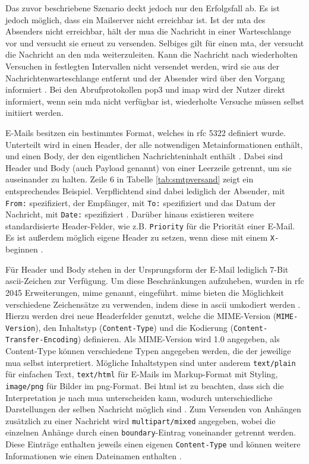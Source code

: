 Das zuvor beschriebene Szenario deckt jedoch nur den Erfolgsfall ab. Es ist jedoch möglich, dass ein Mailserver nicht erreichbar ist. Ist der \acrshort{mta} des Absenders nicht erreichbar, hält der \acrshort{mua} die Nachricht in einer Warteschlange vor und versucht sie erneut zu versenden. Selbiges gilt für einen \acrshort{mta}, der versucht die Nachricht an den \acrshort{mda} weiterzuleiten. Kann die Nachricht nach wiederholten Versuchen in festlegten Intervallen nicht versendet werden, wird sie aus der Nachrichtenwarteschlange entfernt und der Absender wird über den Vorgang informiert \citep[S. 144 f.]{Kurose2014}. Bei den Abrufprotokollen \acrshort{pop3} und \acrshort{imap} wird der Nutzer direkt informiert, wenn sein \acrshort{mda} nicht verfügbar ist, wiederholte Versuche müssen selbst initiiert werden.

E-Mails besitzen ein bestimmtes Format, welches in \acrshort{rfc} 5322 definiert wurde. Unterteilt wird in einen Header, der alle notwendigen Metainformationen enthält, und einen Body, der den eigentlichen Nachrichteninhalt enthält \citep[S. 6 ff.]{RFC5322}. Dabei sind Header und Body (auch Payload genannt) von einer Leerzeile getrennt, um sie auseinander zu halten. Zeile 6 in Tabelle \ref{tab:smtpversand} zeigt ein entsprechendes Beispiel. Verpflichtend sind dabei lediglich der Absender, mit \texttt{From:} spezifiziert, der Empfänger, mit \texttt{To:} spezifiziert und das Datum der Nachricht, mit \texttt{Date:} spezifiziert \citep[S. 18]{RFC5322}. Darüber hinaus existieren weitere standardisierte Header-Felder, wie z.B. \texttt{Priority} für die Priorität einer E-Mail.  Es ist außerdem möglich eigene Header zu setzen, wenn diese mit einem \texttt{X-} beginnen \citep[S. 24]{RFC822}. 

Für Header und Body stehen in der Ursprungsform der E-Mail lediglich 7-Bit \acrshort{ascii}-Zeichen zur Verfügung. Um diese Beschränkungen aufzuheben, wurden in \acrshort{rfc} 2045 Erweiterungen, \acrfull{mime} genannt, eingeführt. \acrshort{mime} bieten die Möglichkeit verschiedene Zeichensätze zu verwenden, indem diese in \acrshort{ascii} umkodiert werden \citep[S. 3 f.]{RFC2045}. Hierzu werden drei neue Headerfelder genutzt, welche die MIME-Version (\texttt{MIME-Version}), den Inhaltstyp (\texttt{Content-Type}) und die Kodierung (\texttt{Content-Transfer-Encoding}) definieren. Als MIME-Version wird 1.0 angegeben, als Content-Type können verschiedene Typen angegeben werden, die der jeweilige \acrshort{mua} selbst interpretiert. Mögliche Inhaltstypen sind unter anderem \texttt{text/plain} für einfachen Text, \texttt{text/html} für E-Mails im Markup-Format mit Styling, \texttt{image/png} für Bilder im \acrshort{png}-Format. Bei \acrshort{html} ist zu beachten, dass sich die Interpretation je nach \acrshort{mua} unterscheiden kann, wodurch unterschiedliche Darstellungen der selben Nachricht möglich sind \citep[S. 6 f.]{RFC2046}. Zum Versenden von Anhängen zusätzlich zu einer Nachricht wird \texttt{multipart/mixed} angegeben, wobei die einzelnen Anhänge durch einen \texttt{boundary}-Eintrag voneinander getrennt werden. Diese Einträge enthalten jeweils einen eigenen \texttt{Content-Type} und können weitere Informationen wie einen Dateinamen enthalten \citep[S. 268 f.]{Zisler2014}. 

